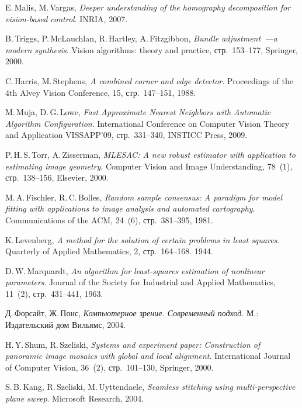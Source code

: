 \documentclass[a4paper,12pt]{article}
\begin{document}
\begin{thebibliography}{99}
  E.\,Malis, M.\,Vargas,
  \emph{Deeper understanding of the homography decomposition for vision-based control}.
  INRIA,
  2007.
  
  B.\,Triggs, P.\,McLauchlan, R.\,Hartley, A.\,Fitzgibbon,
  \emph{Bundle adjustment~---a modern synthesis}.
  Vision algorithms: theory and practice,
  стр.~153--177,
  Springer,
  2000.

  C.\,Harris, M.\,Stephens,
  \emph{A combined corner and edge detector}.
  Proceedings of the 4th Alvey Vision Conference,
  15,
  стр.~147--151,
  1988.

  M.\,Muja, D.\,G.\,Lowe,
  \emph{Fast Approximate Nearest Neighbors with Automatic Algorithm Configuration}.
  International Conference on Computer Vision Theory and Application VISSAPP'09,
  стр.~331--340,
  INSTICC Press,
  2009.

  P.\,H.\,S.\,Torr, A.\,Zisserman,
  \emph{MLESAC: A new robust estimator with application to estimating image geometry}.
  Computer Vision and Image Understanding,
  78~(1),
  стр.~138--156,
  Elsevier,
  2000.
  
  M.\,A.\,Fischler, R.\,C.\,Bolles,
  \emph{Random sample consensus: A paradigm for model fitting with applications to image analysis and automated cartography}.
  Communications of the ACM, 
  24~(6),
  стр.~381--395,
  1981.
 
  K.\,Levenberg,
  \emph{A method for the solution of certain problems in least squares}.
  Quarterly of Applied Mathematics, 
  2,
  стр.~164--168.
  1944.

   D.\,W.\,Marquardt,
   \emph{An algorithm for least-squares estimation of nonlinear parameters}.
   Journal of the Society for Industrial and Applied Mathematics,
   11~(2),
   стр.~431--441,
   1963.

  Д.\,Форсайт, Ж.\,Понс,
  \emph{Компьютерное зрение. Современный подход}.
  М.: Издательский дом {\guillemotleft}Вильямс{\guillemotright},
  2004.

  H.\,Y.\,Shum, R.\,Szeliski,
  \emph{Systems and experiment paper: Construction of panoramic image mosaics with global and local alignment}.
  International Journal of Computer Vision,
  36~(2),
  стр.~101--130,
  Springer,
  2000.
  
  S.\,B.\,Kang, R.\,Szeliski, M.\,Uyttendaele,
  \emph{Seamless stitching using multi-perspective plane sweep}.
  Microsoft Research,
  2004.

\end{thebibliography}
\end{document}
